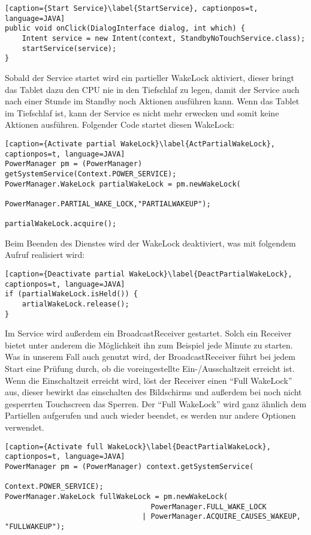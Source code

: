 \begin{flushleft}
\begin{lstlisting}[caption={Start Service}\label{StartService}, captionpos=t, language=JAVA] 
public void onClick(DialogInterface dialog, int which) {
	Intent service = new Intent(context, StandbyNoTouchService.class);
	startService(service);
}
\end{lstlisting}

Sobald der Service startet wird ein partieller WakeLock aktiviert, dieser bringt das Tablet dazu den CPU nie in den Tiefschlaf zu legen, damit der Service auch nach einer Stunde im Standby noch Aktionen ausführen kann. Wenn das Tablet im Tiefschlaf ist, kann der Service es nicht mehr erwecken und somit keine Aktionen ausführen. Folgender Code startet diesen WakeLock:

\begin{lstlisting}[caption={Activate partial WakeLock}\label{ActPartialWakeLock}, captionpos=t, language=JAVA]
PowerManager pm = (PowerManager) getSystemService(Context.POWER_SERVICE);
PowerManager.WakeLock partialWakeLock = pm.newWakeLock(
							PowerManager.PARTIAL_WAKE_LOCK,"PARTIALWAKEUP");

partialWakeLock.acquire();
\end{lstlisting}
\newpage
Beim Beenden des Dienstes wird der WakeLock deaktiviert, was mit folgendem Aufruf realisiert wird:
\begin{lstlisting}[caption={Deactivate partial WakeLock}\label{DeactPartialWakeLock}, captionpos=t, language=JAVA]
if (partialWakeLock.isHeld()) {
	artialWakeLock.release();
}
\end{lstlisting}

Im Service wird außerdem ein BroadcastReceiver gestartet. Solch ein Receiver bietet unter anderem die Möglichkeit ihn zum Beispiel jede Minute zu starten. Was in unserem Fall auch genutzt wird, der BroadcastReceiver führt bei jedem Start eine Prüfung durch, ob die voreingestellte Ein-/Ausschaltzeit erreicht ist. Wenn die Einschaltzeit erreicht wird, löst der Receiver einen ``Full WakeLock'' aus, dieser bewirkt das einschalten des Bildschirms und außerdem bei noch nicht gesperrten Touchscreen das Sperren. Der ``Full WakeLock'' wird ganz ähnlich dem Partiellen aufgerufen und auch wieder beendet, es werden nur andere Optionen verwendet.
\begin{lstlisting}[caption={Activate full WakeLock}\label{DeactPartialWakeLock}, captionpos=t, language=JAVA]
PowerManager pm = (PowerManager) context.getSystemService(
								                             Context.POWER_SERVICE);
PowerManager.WakeLock fullWakeLock = pm.newWakeLock(
					              PowerManager.FULL_WAKE_LOCK
					            | PowerManager.ACQUIRE_CAUSES_WAKEUP, "FULLWAKEUP");
						

\end{lstlisting}
\end{flushleft}
